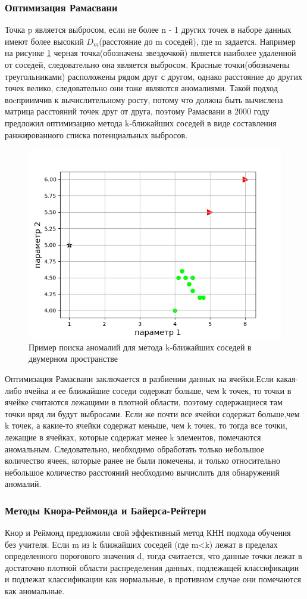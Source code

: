  \subsubsection{Оптимизация Рамасвани} 	
 Точка p является выбросом,
если не более n - 1 других точек в наборе данных имеют более высокий $D_m$(расстояние до m соседей), где m задается. Например на рисунке \ref{fig02} черная точка(обозначена звездочкой) является наиболее удаленной от соседей, следовательно она является выбросом. Красные точки(обозначены треугольниками) расположены рядом друг с другом, однако расстояние до других точек велико, следовательно они тоже являются аномалиями. Такой подход воcприимчив к вычислительному росту, потому что должна быть вычислена матрица расстояний точек друг от друга, поэтому Рамасвани в 2000 году предложил оптимизацию метода k-ближайших соседей  в виде составления ранжированного списка потенциальных выбросов.
\begin{figure}
	\centering
	\includegraphics[width=.5\textwidth]{img/2_1.png}
	\caption{Пример поиска аномалий для метода k-ближайших соседей в двумерном пространстве}
	\label{fig02}
\end{figure}

 Оптимизация Рамасвани заключается в разбиении данных на ячейки.Если какая-либо ячейка и ее ближайшие соседи содержат больше, чем k
 точек, то точки в ячейке считаются лежащими в плотной области,
 поэтому содержащиеся там точки вряд ли будут выбросами. Если же почти все ячейки содержат больше,чем k точек, а какие-то ячейки содержат меньше, чем k точек, то тогда все точки, лежащие в ячейках, которые содержат  менее k элементов, помечаются  аномальным. Следовательно,
 необходимо обработать только небольшое количество ячеек, которые ранее не были помечены, и только относительно небольшое количество расстояний необходимо вычислить для обнаружений аномалий. 

 \subsubsection{Методы Кнора-Реймонда и Байерса-Рейтери}
 Кнор и Реймонд предложили свой эффективный метод  КНН подхода обучения без учителя\cite{Book09}. Если m из k ближайших соседей (где m<k) лежат
 в пределах определенного порогового значения d, тогда  считается, что  данные точки лежат в достаточно плотной области распределения данных, подлежащей классификации и подлежат классификации как нормальные, в противном случае они помечаются как аномальные.
 
